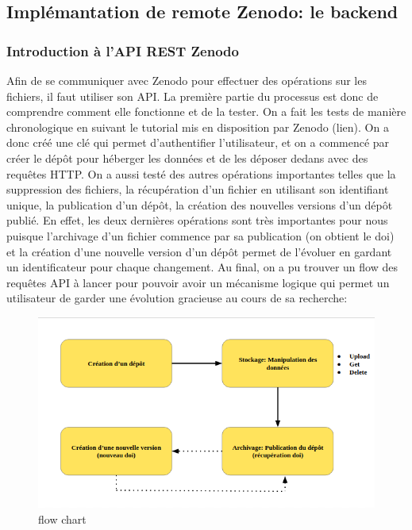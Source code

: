 \documentclass[11pt]{article}
\begin{document}
\subsection{Implémantation de remote Zenodo: le backend}
\label{sec:org86e4ec3}
\subsubsection{Introduction à l'API REST Zenodo}
\label{sec:org75316c8}
Afin de se communiquer avec Zenodo pour effectuer des
opérations sur les fichiers, il faut utiliser son API. La première
partie du processus est donc de comprendre comment elle fonctionne et de
la tester. On a fait les tests de manière chronologique en suivant le
tutorial mis en disposition par Zenodo (lien). On a donc créé une clé
qui permet d'authentifier l'utilisateur, et on a commencé par créer le
dépôt pour héberger les données et de les déposer dedans avec des
requêtes HTTP. On a aussi testé des autres opérations importantes
telles que la suppression des fichiers, la récupération d'un fichier
en utilisant son identifiant unique, la publication d'un dépôt, la
création des nouvelles versions d'un dépôt publié. En effet, les deux
dernières opérations sont très importantes pour nous puisque
l'archivage d'un fichier commence par sa publication (on obtient le
doi) et la création d'une nouvelle version d'un dépôt permet de
l'évoluer en gardant un identificateur pour chaque changement.
Au final, on a pu trouver un flow des requêtes API à lancer pour
pouvoir avoir un mécanisme logique qui permet un utilisateur de garder
une évolution gracieuse au cours de sa recherche:

\begin{figure}[htbp]
\centering
\includegraphics[width=.9\linewidth]{./flowchart.png}
\caption{\label{fig:orgaa2fcc4}flow chart}
\end{figure}
\end{document}
